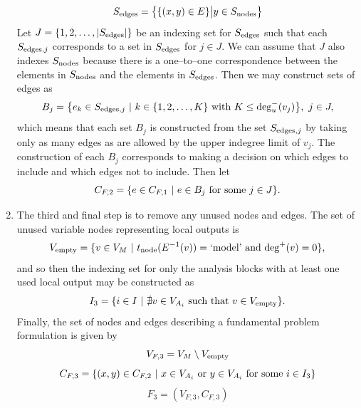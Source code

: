 \begin{enumerate}
\begin{equation}
S_\textrm{edges} = \big \{ \{(x,y) \in E\} \big | y \in S_\textrm{nodes} \big \}
\end{equation}
Let $J=\{1,2,\ldots,|S_\textrm{edges}|\}$ be an indexing set for $S_\textrm{edges}$ such that each $S_{\textrm{edges},j}$ corresponds to a set in $S_\textrm{edges}$ for $j \in J$. We can assume that $J$ also indexes $S_\textrm{nodes}$ because there is a one--to--one correspondence between the elements in $S_\textrm{nodes}$ and the elements in $S_\textrm{edges}$. Then we may construct sets of edges as
\begin{equation}
B_j = \big \{e_k \in S_{\textrm{edges},j} \ | \ k \in \{1,2,\ldots,K\} \textrm{ with } K \leq \textrm{deg}_u^-(v_j) \big \}, \ j \in J,
\end{equation}
which means that each set $B_j$ is constructed from the set $S_{\textrm{edges},j}$ by taking only as many edges as are allowed by the upper indegree limit of $v_j$. The construction of each $B_j$ corresponds to making a decision on which edges to include and which edges not to include. Then let
\begin{equation}
C_{F,2} = \{ e \in C_{F,1} \ | \ e \in B_j \textrm{ for some } j \in J\}.
\end{equation}
\item The third and final step is to remove any unused nodes and edges. The set of unused variable nodes representing local outputs is
\begin{equation}
V_\txt{empty} = \{v \in V_M \ | \ t_\txt{node}(E^{-1}(v))=\txt{`model'} \txt{ and } \txt{deg}^+(v) = 0\},
\end{equation}
and so then the indexing set for only the analysis blocks with at least one used local output may be constructed as
\begin{equation}
I_3 =  \{i \in I \ | \ \nexists v \in V_{A_i} \textrm{ such that }  v \in V_\textrm{empty} \}.
\end{equation}
Finally, the set of nodes and edges describing a fundamental problem formulation is given by
\begin{equation}
V_{F,3} = V_M \setminus V_\textrm{empty}
\end{equation}
\begin{equation}
C_{F,3} = \{ (x,y) \in C_{F,2} \ | \ x \in V_{A_i} \textrm{ or } y \in V_{A_i} \textrm{ for some } i \in I_3 \}
\end{equation}
\begin{equation}
F_3 = (V_{F,3},C_{F,3})
\end{equation}





\end{enumerate}



